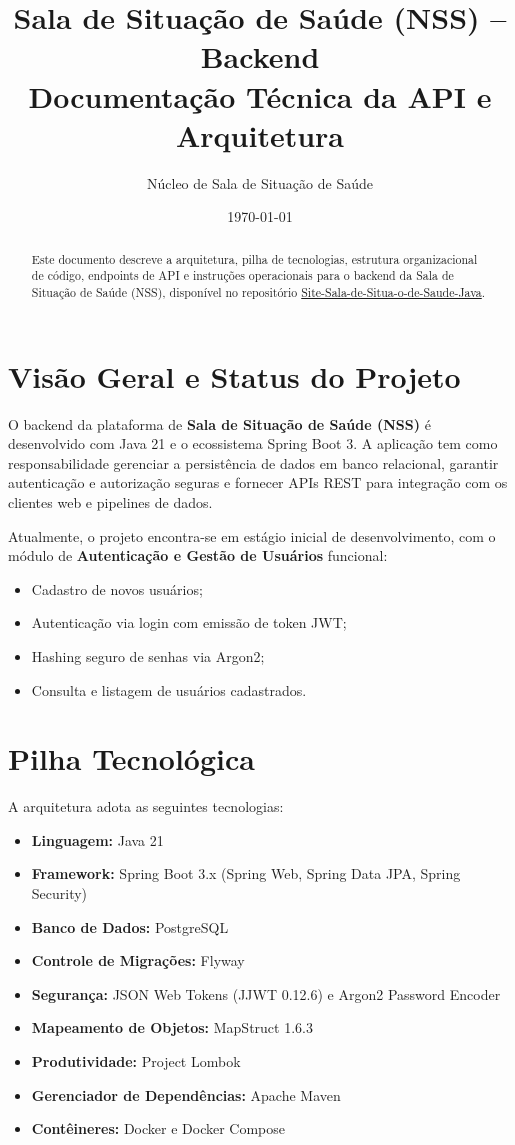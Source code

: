 \documentclass[12pt,a4paper]{article}
\title{\textbf{Sala de Situação de Saúde (NSS) -- Backend}\\\large Documentação Técnica da API e Arquitetura}
\author{Núcleo de Sala de Situação de Saúde}
\date{\today}
\begin{document}
\maketitle

\begin{abstract}
Este documento descreve a arquitetura, pilha de tecnologias, estrutura organizacional de código, endpoints de API e instruções operacionais para o backend da Sala de Situação de Saúde (NSS), disponível no repositório \href{https://github.com/ArtursPereira/Site-Sala-de-Situa-o-de-Saude-Java}{Site-Sala-de-Situa-o-de-Saude-Java}.
\end{abstract}

\tableofcontents
\newpage

\section{Visão Geral e Status do Projeto}

O backend da plataforma de \textbf{Sala de Situação de Saúde (NSS)} é desenvolvido com Java 21 e o ecossistema Spring Boot 3. A aplicação tem como responsabilidade gerenciar a persistência de dados em banco relacional, garantir autenticação e autorização seguras e fornecer APIs REST para integração com os clientes web e pipelines de dados.

Atualmente, o projeto encontra-se em estágio inicial de desenvolvimento, com o módulo de \textbf{Autenticação e Gestão de Usuários} funcional:
\begin{itemize}[noitemsep]
\item Cadastro de novos usuários;
\item Autenticação via login com emissão de token JWT;
\item Hashing seguro de senhas via Argon2;
\item Consulta e listagem de usuários cadastrados.
\end{itemize}

\section{Pilha Tecnológica}

A arquitetura adota as seguintes tecnologias:
\begin{itemize}[noitemsep]
\item \textbf{Linguagem:} Java 21
\item \textbf{Framework:} Spring Boot 3.x (Spring Web, Spring Data JPA, Spring Security)
\item \textbf{Banco de Dados:} PostgreSQL
\item \textbf{Controle de Migrações:} Flyway
\item \textbf{Segurança:} JSON Web Tokens (JJWT 0.12.6) e Argon2 Password Encoder
\item \textbf{Mapeamento de Objetos:} MapStruct 1.6.3
\item \textbf{Produtividade:} Project Lombok
\item \textbf{Gerenciador de Dependências:} Apache Maven
\item \textbf{Contêineres:} Docker e Docker Compose
\end{itemize}
\end{document}
